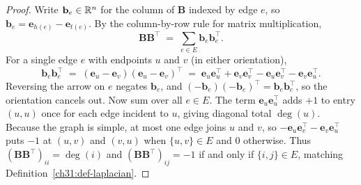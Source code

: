 \begin{proof}
Write $\mathbf{b}_e \in \mathbb{R}^n$ for the column of $\mathbf{B}$ indexed by edge $e$, so $\mathbf{b}_e = \mathbf{e}_{h(e)} - \mathbf{e}_{t(e)}$. By the column-by-row rule for matrix multiplication,
\[
  \mathbf{B} \mathbf{B}^\top \;=\; \sum_{e\in E} \mathbf{b}_e \mathbf{b}_e^\top .
\]
For a single edge $e$ with endpoints $u$ and $v$ (in either orientation),
\[
  \mathbf{b}_e \mathbf{b}_e^\top
  \;=\; (\mathbf{e}_u - \mathbf{e}_v)(\mathbf{e}_u - \mathbf{e}_v)^\top
  \;=\; \mathbf{e}_u\mathbf{e}_u^\top + \mathbf{e}_v\mathbf{e}_v^\top - \mathbf{e}_u\mathbf{e}_v^\top - \mathbf{e}_v\mathbf{e}_u^\top .
\]
Reversing the arrow on $e$ negates $\mathbf{b}_e$, and $(-\mathbf{b}_e)(-\mathbf{b}_e)^\top = \mathbf{b}_e\mathbf{b}_e^\top$, so the orientation cancels out. Now sum over all $e \in E$. The term $\mathbf{e}_u\mathbf{e}_u^\top$ adds $+1$ to entry $(u,u)$ once for each edge incident to $u$, giving diagonal total $\deg(u)$. Because the graph is simple, at most one edge joins $u$ and $v$, so $-\mathbf{e}_u\mathbf{e}_v^\top - \mathbf{e}_v\mathbf{e}_u^\top$ puts $-1$ at $(u,v)$ and $(v,u)$ when $\{u,v\}\in E$ and $0$ otherwise. Thus $(\mathbf{B}\mathbf{B}^\top)_{ii} = \deg(i)$ and $(\mathbf{B}\mathbf{B}^\top)_{ij} = -1$ if and only if $\{i,j\}\in E$, matching Definition~\ref{ch31:def-laplacian}.
\end{proof}

